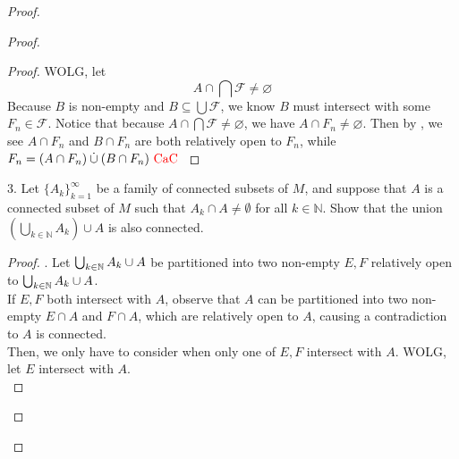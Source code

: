 \documentclass{report}
\begin{document}
\begin{proof}
\begin{proof}
\begin{proof}
WOLG, let
\begin{equation}
A\cap \bigcap \mathcal{F}\neq \varnothing
\end{equation}
Because $B$ is non-empty and $B\subseteq \bigcup \mathcal{F}$, we know $B$ must intersect with some $F_n\in \mathcal{F}$. Notice that because $A\cap \bigcap \mathcal{F}\neq \varnothing$, we have $A\cap F_n\neq \varnothing$. Then by , we see $A\cap F_n$ and $B\cap F_n$ are both relatively open to $F_n$, while $F_n= (A\cap F_n)\mathbin{\dot{\cup}} (B\cap F_n)\text{ \textcolor{red}{CaC} }$ 
\end{proof}
\begin{question}{}{}
3. Let $\{A_k\}_{k=1}^{\infty}$ be a family of connected subsets of $M$, and suppose that $A$ is a connected subset of $M$ such that $A_k \cap A \neq \emptyset$ for all $k \in \mathbb{N}$. Show that the union $\left(\bigcup_{k \in \mathbb{N}} A_k\right) \cup A$ is also connected.
\end{question}
\begin{proof}
. Let $\bigcup_{k\in\mathbb{N}}A_k\cup A$ be partitioned into two non-empty  $E,F$ relatively open to  $\bigcup_{k\in\mathbb{N}}A_k\cup A$.\\

If $E,F$ both intersect with  $A$, observe that $A$ can be partitioned into two non-empty $E\cap A$ and $F\cap A$, which are relatively open to $A$, causing a contradiction to  $A$ is connected.\\

Then, we only have to consider when only one of  $E,F$ intersect with  $A$. WOLG, let  $E$ intersect with $A$.\\


\end{proof}
\end{proof}
\end{proof}
\end{document}
